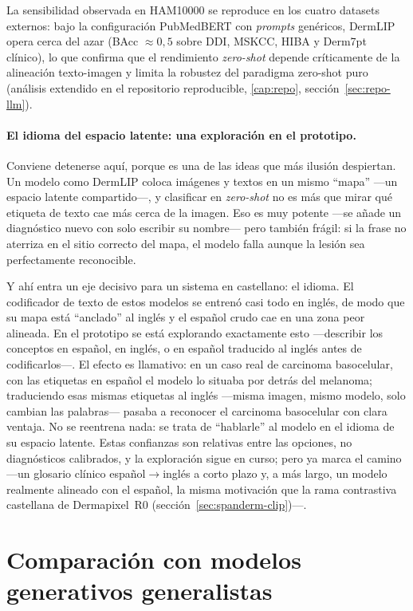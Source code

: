La sensibilidad observada en HAM10000 se reproduce en los cuatro
datasets externos: bajo la configuración PubMedBERT con \emph{prompts}
genéricos, DermLIP opera cerca del azar (BAcc $\approx 0{,}5$ sobre
DDI, MSKCC, HIBA y Derm7pt clínico), lo que
confirma que el rendimiento \emph{zero-shot} depende críticamente de la
alineación texto-imagen y limita la robustez del paradigma zero-shot
puro (análisis extendido en el repositorio reproducible, \ref{cap:repo}, sección~\ref{sec:repo-llm}).

\paragraph{El idioma del espacio latente: una exploración en el
prototipo.}
Conviene detenerse aquí, porque es una de las ideas que más ilusión
despiertan. Un modelo como DermLIP coloca imágenes y textos en un mismo
``mapa'' ---un espacio latente compartido---, y clasificar en
\emph{zero-shot} no es más que mirar qué etiqueta de texto cae más
cerca de la imagen. Eso es muy potente ---se añade un diagnóstico nuevo
con solo escribir su nombre--- pero también frágil: si la frase no
aterriza en el sitio correcto del mapa, el modelo falla aunque la
lesión sea perfectamente reconocible.

Y ahí entra un eje decisivo para un sistema en castellano: el idioma.
El codificador de texto de estos modelos se entrenó casi todo en
inglés, de modo que su mapa está ``anclado'' al inglés y el español
crudo cae en una zona peor alineada. En el prototipo se está explorando
exactamente esto ---describir los conceptos en español, en inglés, o en
español traducido al inglés antes de codificarlos---. El efecto es
llamativo: en un caso real de carcinoma basocelular, con las etiquetas
en español el modelo lo situaba por detrás del melanoma; traduciendo
esas mismas etiquetas al inglés ---misma imagen, mismo modelo, solo
cambian las palabras--- pasaba a reconocer el carcinoma basocelular con
clara ventaja. No se reentrena nada: se trata de ``hablarle'' al modelo
en el idioma de su espacio latente. Estas confianzas son relativas
entre las opciones, no diagnósticos calibrados, y la exploración sigue
en curso; pero ya marca el camino ---un glosario clínico
español$\to$inglés a corto plazo y, a más largo, un modelo realmente
alineado con el español, la misma motivación que la rama contrastiva
castellana de Dermapixel~R0 (sección~\ref{sec:spanderm-clip})---.

\section{Comparación con modelos generativos generalistas}
\label{sec:llm-results}


